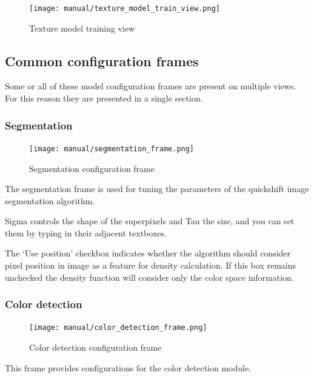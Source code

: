 \documentclass[12pt]{report}
\begin{document}
	\begin{figure}[h!]
		\centering
		\texttt{[image: manual/texture\_model\_train\_view.png]}
		\caption{Texture model training view}
	\end{figure}
	
	\subsection{Common configuration frames} \label{configuration_frames}
	Some or all of these model configuration frames are present on multiple views. For this reason they are presented in a single section.
	
	\subsubsection{Segmentation}
	
	\begin{figure}
		\begin{center}
			\texttt{[image: manual/segmentation\_frame.png]}
		\end{center}
		\caption{Segmentation configuration frame}
	\end{figure}
	
	The segmentation frame is used for tuning the parameters of the quickshift image segmentation algorithm. 
	
	Sigma controls the shape of the superpixels and Tau the size, and you can set them by typing in their adjacent textboxes. 
	
	The ‘Use position’ checkbox indicates whether the algorithm should consider pixel position in image as a feature for density calculation. If this box remains unchecked the density function will consider only the color space information.
	
	\subsubsection{Color detection}
	
	\begin{figure}
		\begin{center}
			\texttt{[image: manual/color\_detection\_frame.png]}
		\end{center}
		\caption{Color detection configuration frame}
	\end{figure}
	
	This frame provides configurations for the color detection module.
	
\end{document}
